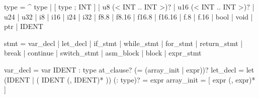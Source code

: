 \documentclass[
  11pt,
]{article}
\newenvironment{Shaded}{\begin{snugshade}}{\end{snugshade}}
\newcommand{\NormalTok}[1]{#1}
\begin{document}
\begin{Shaded}
\begin{Highlighting}[]
\NormalTok{type           = \textquotesingle{}\^{}\textquotesingle{} type}
\NormalTok{               | \textquotesingle{}[\textquotesingle{} type \textquotesingle{};\textquotesingle{} INT \textquotesingle{}]\textquotesingle{}}
\NormalTok{               | \textquotesingle{}u8\textquotesingle{} (\textquotesingle{}\textless{}\textquotesingle{} INT \textquotesingle{}..\textquotesingle{} INT \textquotesingle{}\textgreater{}\textquotesingle{})?}
\NormalTok{               | \textquotesingle{}u16\textquotesingle{} (\textquotesingle{}\textless{}\textquotesingle{} INT \textquotesingle{}..\textquotesingle{} INT \textquotesingle{}\textgreater{}\textquotesingle{})?}
\NormalTok{               | \textquotesingle{}u24\textquotesingle{} | \textquotesingle{}u32\textquotesingle{} | \textquotesingle{}i8\textquotesingle{} | \textquotesingle{}i16\textquotesingle{} | \textquotesingle{}i24\textquotesingle{} | \textquotesingle{}i32\textquotesingle{}}
\NormalTok{               | \textquotesingle{}f8.8\textquotesingle{} | \textquotesingle{}f8.16\textquotesingle{} | \textquotesingle{}f16.8\textquotesingle{} | \textquotesingle{}f16.16\textquotesingle{} | \textquotesingle{}f.8\textquotesingle{} | \textquotesingle{}f.16\textquotesingle{}}
\NormalTok{               | \textquotesingle{}bool\textquotesingle{} | \textquotesingle{}void\textquotesingle{} | \textquotesingle{}ptr\textquotesingle{}}
\NormalTok{               | IDENT}

\NormalTok{stmt           = var\_decl | let\_decl | if\_stmt | while\_stmt | for\_stmt}
\NormalTok{               | return\_stmt | \textquotesingle{}break\textquotesingle{} | \textquotesingle{}continue\textquotesingle{} | switch\_stmt}
\NormalTok{               | asm\_block | block | expr\_stmt}

\NormalTok{var\_decl       = \textquotesingle{}var\textquotesingle{} IDENT \textquotesingle{}:\textquotesingle{} type at\_clause? (\textquotesingle{}=\textquotesingle{} (array\_init | expr))?}
\NormalTok{let\_decl       = \textquotesingle{}let\textquotesingle{} (IDENT | \textquotesingle{}(\textquotesingle{} IDENT (\textquotesingle{},\textquotesingle{} IDENT)* \textquotesingle{})\textquotesingle{}) (\textquotesingle{}:\textquotesingle{} type)? \textquotesingle{}=\textquotesingle{} expr}
\NormalTok{array\_init     = \textquotesingle{}[\textquotesingle{} expr (\textquotesingle{},\textquotesingle{} expr)* \textquotesingle{}]\textquotesingle{}}


\end{Highlighting}
\end{Shaded}
\end{document}
